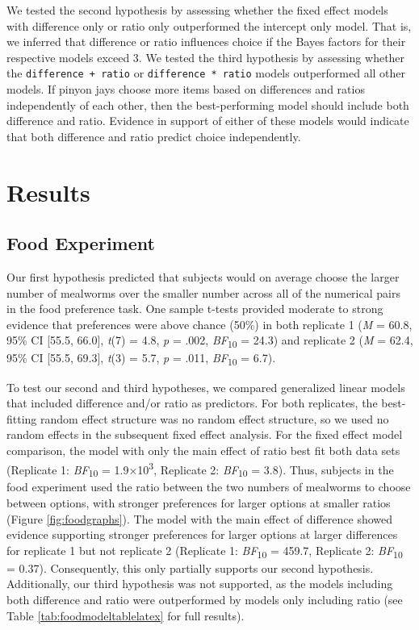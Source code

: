 \documentclass[
  ,pub,floatsintext]{apa6}
\begin{document}
We tested the second hypothesis by assessing whether the fixed effect models with difference only or ratio only outperformed the intercept only model. That is, we inferred that difference or ratio influences choice if the Bayes factors for their respective models exceed 3. We tested the third hypothesis by assessing whether the \texttt{difference\ +\ ratio} or \texttt{difference\ *\ ratio} models outperformed all other models. If pinyon jays choose more items based on differences and ratios independently of each other, then the best-performing model should include both difference and ratio. Evidence in support of either of these models would indicate that both difference and ratio predict choice independently.

\hypertarget{results}{%
\section{Results}\label{results}}

\hypertarget{food-experiment-1}{%
\subsection{Food Experiment}\label{food-experiment-1}}

Our first hypothesis predicted that subjects would on average choose the larger number of mealworms over the smaller number across all of the numerical pairs in the food preference task. One sample t-tests provided moderate to strong evidence that preferences were above chance (50\%) in both replicate 1 (\emph{M} = 60.8, 95\% CI {[}55.5, 66.0{]}, \emph{t}(7) = 4.8, \emph{p} = .002, \emph{BF}\textsubscript{10} = 24.3) and replicate 2 (\emph{M} = 62.4, 95\% CI {[}55.5, 69.3{]}, \emph{t}(3) = 5.7, \emph{p} = .011, \emph{BF}\textsubscript{10} = 6.7).

To test our second and third hypotheses, we compared generalized linear models that included difference and/or ratio as predictors. For both replicates, the best-fitting random effect structure was no random effect structure, so we used no random effects in the subsequent fixed effect analysis. For the fixed effect model comparison, the model with only the main effect of ratio best fit both data sets (Replicate 1: \emph{BF}\textsubscript{10} = 1.9×10\textsuperscript{3}, Replicate 2: \emph{BF}\textsubscript{10} = 3.8). Thus, subjects in the food experiment used the ratio between the two numbers of mealworms to choose between options, with stronger preferences for larger options at smaller ratios (Figure \ref{fig:foodgraphs}). The model with the main effect of difference showed evidence supporting stronger preferences for larger options at larger differences for replicate 1 but not replicate 2 (Replicate 1: \emph{BF}\textsubscript{10} = 459.7, Replicate 2: \emph{BF}\textsubscript{10} = 0.37). Consequently, this only partially supports our second hypothesis. Additionally, our third hypothesis was not supported, as the models including both difference and ratio were outperformed by models only including ratio (see Table \ref{tab:foodmodeltablelatex} for full results).
\end{document}
